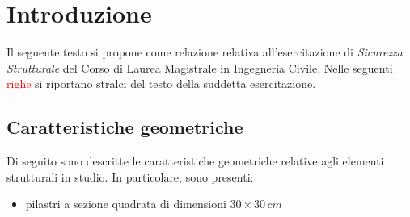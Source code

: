 \chapter{Introduzione}
Il seguente testo si propone come relazione relativa all'esercitazione di \emph{Sicurezza Strutturale} del Corso di Laurea Magistrale in Ingegneria Civile. Nelle seguenti \textcolor{red}{righe} si riportano stralci del testo della suddetta esercitazione.

\section*{Caratteristiche geometriche}
Di seguito sono descritte le caratteristiche geometriche relative agli elementi strutturali in studio. In particolare, sono presenti:
\begin{itemize}
 \item pilastri a sezione quadrata di dimensioni $30 \times 30\,cm$
\end{itemize}
